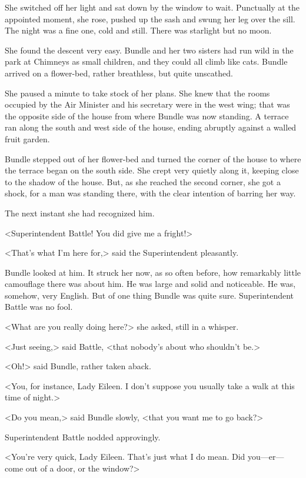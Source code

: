 She switched off her light and sat down by the window to wait. Punctually at the appointed moment, she rose, pushed up the sash and swung her leg over the sill. The night was a fine one, cold and still. There was starlight but no moon.

She found the descent very easy. Bundle and her two sisters had run wild in the park at Chimneys as small children, and they could all climb like cats. Bundle arrived on a flower-bed, rather breathless, but quite unscathed.

She paused a minute to take stock of her plans. She knew that the rooms occupied by the Air Minister and his secretary were in the west wing; that was the opposite side of the house from where Bundle was now standing. A terrace ran along the south and west side of the house, ending abruptly against a walled fruit garden.

Bundle stepped out of her flower-bed and turned the corner of the house to where the terrace began on the south side. She crept very quietly along it, keeping close to the shadow of the house. But, as she reached the second corner, she got a shock, for a man was standing there, with the clear intention of barring her way.

The next instant she had recognized him.

<Superintendent Battle! You did give me a fright!>

<That's what I'm here for,> said the Superintendent pleasantly.

Bundle looked at him. It struck her now, as so often before, how remarkably little camouflage there was about him. He was large and solid and noticeable. He was, somehow, very English. But of one thing Bundle was quite sure. Superintendent Battle was no fool.

<What are you really doing here?> she asked, still in a whisper.

<Just seeing,> said Battle, <that nobody's about who shouldn't be.>

<Oh!> said Bundle, rather taken aback.

<You, for instance, Lady Eileen. I don't suppose you usually take a walk at this time of night.>

<Do you mean,> said Bundle slowly, <that you want me to go back?>

Superintendent Battle nodded approvingly.

<You're very quick, Lady Eileen. That's just what I do mean. Did you—er—come out of a door, or the window?>


